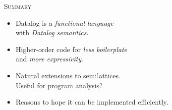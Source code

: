 \documentclass[dvipsnames,fleqn]{beamer}
\begin{document}

\begin{frame}{\scshape Summary}
  \begin{itemize}\setlength\itemsep{1.5ex}
  \item Datalog is a \emph{functional language}\\with \emph{Datalog semantics}.

  \item Higher-order code for
    \emph{less boilerplate}\\ and
    \emph{more expressivity}.

  \item Natural extensions to semilattices.\\
    Useful for program analysis?

  \item Reasons to hope it can be implemented efficiently.

  \end{itemize}
  \vfill
\end{frame}
\end{document}
